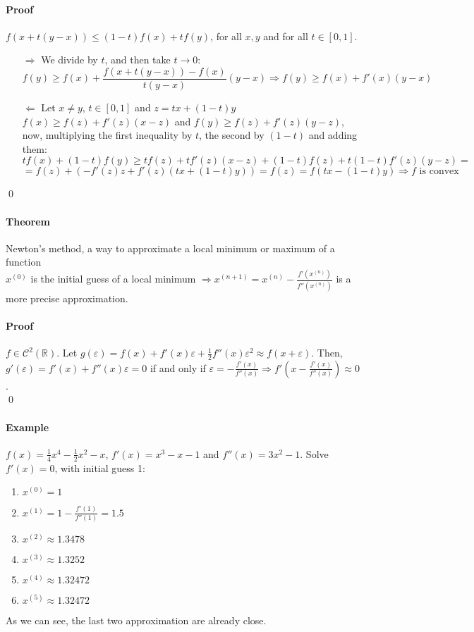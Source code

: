 \documentclass{article}
\newcommand{\intcc}[1]{\left[#1\right]}
\newcommand{\R}{\mathbb{R}}
\newcommand{\C}{\mathcal{C}}
\newcommand{\Ep}{\varepsilon}
\newcommand{\Theorem}{\paragraph{Theorem}}
\newcommand{\Proof}{\paragraph{Proof}}
\newcommand{\Example}{\paragraph{Example}}
\begin{document}
  \Proof $f(x+t(y-x)) \leq (1-t)f(x) + tf(y)$, for all $x,y$ and for all $t \in
  \intcc{0,1}$.
  \begin{itemize}
    \item[$\Rightarrow$] We divide by $t$, and then take $t \to 0$:
    \begin{equation*}
      f(y) \geq f(x) + \frac{f(x+t(y-x)) - f(x)}{t(y-x)}(y-x) \Rightarrow
      f(y) \geq f(x) + f'(x)(y-x)
    \end{equation*}

    \item[$\Leftarrow$] Let $x \neq y$, $t \in \intcc{0,1}$ and $z = tx+(1-t)y$
  \\$f(x) \geq f(z) + f'(z)(x-z)$ and $f(y) \geq f(z) + f'(z)(y-z)$, now,
    multiplying the first inequality by $t$, the second by $(1-t)$ and adding
    them:
    \begin{equation*}
      tf(x) + (1-t)f(y) \geq tf(z) + tf'(z)(x-z) + (1-t)f(z) + t(1-t)f'(z)(y-z)=
    \end{equation*}
    \begin{equation*} =
      f(z) + (-f'(z)z + f'(z)(tx+(1-t)y)) = f(z) = f(tx-(1-t)y) \Rightarrow
      f \text{ is convex}
    \end{equation*}
  \end{itemize}
  \qed

  \Theorem Newton's method, a way to approximate a local minimum or maximum of a
  function
\\ $x^{(0)}$ is the initial guess of a local minimum $\Rightarrow x^{(n+1)} =
  x^{(n)} - \frac{f'(x^{(n)})}{f''(x^{(n)})}$ is a more precise approximation.

  \Proof $f \in \C^2(\R)$. Let $g(\Ep) = f(x) + f'(x)\Ep +
  \frac{1}{2}f''(x)\Ep^2 \approx f(x+\Ep)$. Then, $g'(\Ep) = f'(x) + f''(x)\Ep =
  0$ if and only if $\Ep = -\frac{f'(x)}{f''(x)} \Rightarrow
  f'(x - \frac{f'(x)}{f''(x)}) \approx 0$.
\\\qed

  \Example $f(x) = \frac{1}{4}x^4 - \frac{1}{2}x^2 - x$, $f'(x) = x^3 - x - 1$
  and $f''(x) = 3x^2 - 1$. Solve $f'(x) = 0$, with initial guess 1:
  \begin{enumerate}
    \item $x^{(0)} = 1$
    \item $x^{(1)} = 1 - \frac{f'(1)}{f''(1)} = 1.5$
    \item $x^{(2)} \approx 1.3478$
    \item $x^{(3)} \approx 1.3252$
    \item $x^{(4)} \approx 1.32472$
    \item $x^{(5)} \approx 1.32472$
  \end{enumerate}
  As we can see, the last two approximation are already close.
\end{document}
